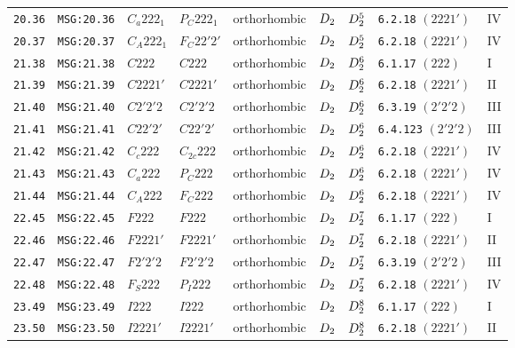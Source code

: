 \documentclass[fleqn,10pt]{jsarticle}
\begin{document}
\begin{center}
\begin{longtable}{lllllllll}
\texttt{20.36} & \texttt{MSG:20.36} & $C_{a}222_{1}$ & $P_{C}222_{1}$ & orthorhombic & $D_{\rm 2}$ & $D_{\rm 2}^{5}$ & \texttt{6.2.18} $(2221')$ & IV \\
\texttt{20.37} & \texttt{MSG:20.37} & $C_{A}222_{1}$ & $F_{C}22'2'$ & orthorhombic & $D_{\rm 2}$ & $D_{\rm 2}^{5}$ & \texttt{6.2.18} $(2221')$ & IV \\ \hline
\texttt{21.38} & \texttt{MSG:21.38} & $C222$ & $C222$ & orthorhombic & $D_{\rm 2}$ & $D_{\rm 2}^{6}$ & \texttt{6.1.17} $(222)$ & I \\
\texttt{21.39} & \texttt{MSG:21.39} & $C2221'$ & $C2221'$ & orthorhombic & $D_{\rm 2}$ & $D_{\rm 2}^{6}$ & \texttt{6.2.18} $(2221')$ & II \\
\texttt{21.40} & \texttt{MSG:21.40} & $C2'2'2$ & $C2'2'2$ & orthorhombic & $D_{\rm 2}$ & $D_{\rm 2}^{6}$ & \texttt{6.3.19} $(2'2'2)$ & III \\
\texttt{21.41} & \texttt{MSG:21.41} & $C22'2'$ & $C22'2'$ & orthorhombic & $D_{\rm 2}$ & $D_{\rm 2}^{6}$ & \texttt{6.4.123} $(2'2'2)$ & III \\
\texttt{21.42} & \texttt{MSG:21.42} & $C_{c}222$ & $C_{2c}222$ & orthorhombic & $D_{\rm 2}$ & $D_{\rm 2}^{6}$ & \texttt{6.2.18} $(2221')$ & IV \\
\texttt{21.43} & \texttt{MSG:21.43} & $C_{a}222$ & $P_{C}222$ & orthorhombic & $D_{\rm 2}$ & $D_{\rm 2}^{6}$ & \texttt{6.2.18} $(2221')$ & IV \\
\texttt{21.44} & \texttt{MSG:21.44} & $C_{A}222$ & $F_{C}222$ & orthorhombic & $D_{\rm 2}$ & $D_{\rm 2}^{6}$ & \texttt{6.2.18} $(2221')$ & IV \\ \hline
\texttt{22.45} & \texttt{MSG:22.45} & $F222$ & $F222$ & orthorhombic & $D_{\rm 2}$ & $D_{\rm 2}^{7}$ & \texttt{6.1.17} $(222)$ & I \\
\texttt{22.46} & \texttt{MSG:22.46} & $F2221'$ & $F2221'$ & orthorhombic & $D_{\rm 2}$ & $D_{\rm 2}^{7}$ & \texttt{6.2.18} $(2221')$ & II \\
\texttt{22.47} & \texttt{MSG:22.47} & $F2'2'2$ & $F2'2'2$ & orthorhombic & $D_{\rm 2}$ & $D_{\rm 2}^{7}$ & \texttt{6.3.19} $(2'2'2)$ & III \\
\texttt{22.48} & \texttt{MSG:22.48} & $F_{S}222$ & $P_{I}222$ & orthorhombic & $D_{\rm 2}$ & $D_{\rm 2}^{7}$ & \texttt{6.2.18} $(2221')$ & IV \\ \hline
\texttt{23.49} & \texttt{MSG:23.49} & $I222$ & $I222$ & orthorhombic & $D_{\rm 2}$ & $D_{\rm 2}^{8}$ & \texttt{6.1.17} $(222)$ & I \\
\texttt{23.50} & \texttt{MSG:23.50} & $I2221'$ & $I2221'$ & orthorhombic & $D_{\rm 2}$ & $D_{\rm 2}^{8}$ & \texttt{6.2.18} $(2221')$ & II \\

\end{longtable}
\end{center}
\end{document}
